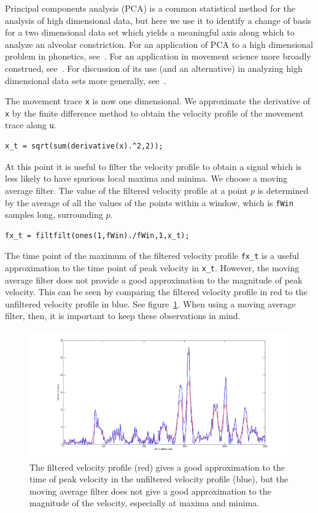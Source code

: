 \documentclass[a4paper, 12pt]{article}
\begin{document}
Principal components analysis (PCA) is a common statistical method for the analysis of high dimensional data, but here we use it to identify a change of basis for a two dimensional data set which yields a meaningful axis along which to analyze an alveolar constriction. For an application of PCA to a high dimensional problem in phonetics, see~\citet{story2007}. For an application in movement science more broadly construed, see~\citet{tseng2003}. For discussion of its use (and an alternative) in analyzing high dimensional data sets more generally, see~\citet{schoener2007}.

The movement trace \texttt{x} is now one dimensional. We approximate the derivative of \texttt{x} by the finite difference method to obtain the velocity profile of the movement trace along \texttt{u}.
\begin{verbatim}
x_t = sqrt(sum(derivative(x).^2,2));
\end{verbatim}
At this point it is useful to filter the velocity profile to obtain a signal which is less likely to have spurious local maxima and minima. We choose a moving average filter. The value of the filtered velocity profile at a point $p$ is determined by the average of all the values of the points within a window, which is \texttt{fWin} samples long, surrounding $p$.
\begin{verbatim}
fx_t = filtfilt(ones(1,fWin)./fWin,1,x_t);
\end{verbatim}
The time point of the maximum of the filtered velocity profile \texttt{fx\_t} is a useful approximation to the time point of peak velocity in \texttt{x\_t}. However, the moving average filter does not provide a good approximation to the magnitude of peak velocity. This can be seen by comparing the filtered velocity profile in red to the unfiltered velocity profile in blue. See figure~\ref{fig:filter}. When using a moving average filter, then, it is important to keep these observations in mind.
\begin{figure}
\centering
\includegraphics[width=.8\textwidth]{p4.png}
\caption{The filtered velocity profile (red) gives a good approximation to the time of peak velocity in the unfiltered velocity profile (blue), but the moving average filter does not give a good approximation to the magnitude of the velocity, especially at maxima and minima.}
\label{fig:filter}
\end{figure}
\end{document}
